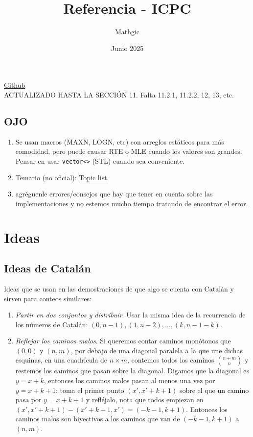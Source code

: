 \documentclass[12 pts,spanish,mexico]{article}
\title{Referencia - ICPC}
\author{Mathgic}
\date{Junio 2025}
\numberwithin{equation}{section}
\begin{document}
\maketitle

\begin{center}
    \href{https://github.com/SJMA11723/Data-structures-and-algorithms}{Github}
    \\ACTUALIZADO HASTA LA SECCIÓN 11. Falta 11.2.1, 11.2.2, 12, 13, etc.
\end{center}

\newpage
\tableofcontents

\newpage

\begin{multicols}{2}

\subsection{OJO}
\begin{enumerate}
    \item Se usan macros (MAXN, LOGN, etc) con arreglos estáticos para más comodidad, pero puede causar RTE o MLE cuando los valores son grandes. Pensar en usar \texttt{vector<>} (STL) cuando sea conveniente.
    \item Temario (no oficial): \href{https://youkn0wwho.academy/topic-list}{Topic list}.
    \item agréguenle errores/consejos que hay que tener en cuenta sobre las implementaciones y no estemos mucho tiempo tratando de encontrar el error.
\end{enumerate}

\section{Ideas}

\subsection{Ideas de Catalán}

Ideas que se usan en las demostraciones de que algo se cuenta con Catalán y sirven para conteos similares:
\begin{enumerate}[1.]
    \item \textit{Partir en dos conjuntos y distribuir}. Usar la misma idea de la recurrencia de los números de Catalán: $(0, n - 1), (1, n - 2), \dots, (k, n - 1 - k)$.
    \item \textit{Reflejar los caminos malos}. Si queremos contar caminos monótonos que $(0, 0)$ y $(n, m)$, por debajo de una diagonal paralela a la que une dichas esquinas, en una cuadrícula de $n \times m$, contemos todos los caminos $\binom{n + m}{n}$ y restemos los caminos que pasan sobre la diagonal. Digamos que la diagonal es $y = x + k$, entonces los caminos malos pasan al menos una vez por $y = x + k + 1$: toma el primer punto $(x', x' + k + 1)$ sobre el que un camino pasa por $y = x + k + 1$ y refléjalo, nota que todos empiezan en $(x', x' + k + 1) - (x' + k + 1, x') = (- k - 1, k + 1)$. Entonces los caminos malos son biyectivos a los caminos que van de $(- k - 1, k + 1)$ a $(n, m)$.
\end{enumerate}


\end{multicols}
\end{document}
